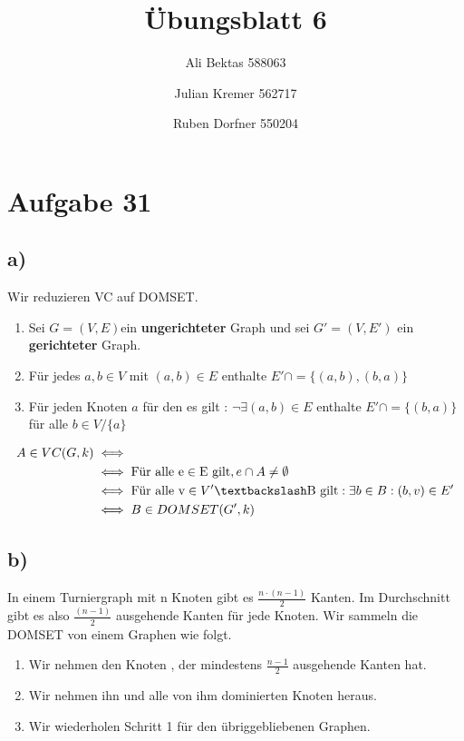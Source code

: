 \documentclass{article}
\title{Übungsblatt 6}
\author{Ali Bektas 588063 \and Julian Kremer 562717 \and Ruben Dorfner 550204}
\begin{document}
	\maketitle
	
	\section*{Aufgabe 31}
		\subsection*{a)}
			Wir reduzieren VC auf DOMSET.
			\begin{enumerate}
				\item Sei $G=(V,E)$ein \textbf{ungerichteter} Graph und sei $G'=(V,E')$ ein \textbf{gerichteter} Graph.
				\item Für jedes $a,b \in V$ mit $(a,b)\in E$ enthalte $E' \cap = \{(a,b),(b,a)\}$
				\item Für jeden Knoten $a$ für den es gilt : $\neg\exists (a,b)\in E$ enthalte $E' \cap = \{(b,a)\}$ für alle $b \in V/\{a\}$
			\end{enumerate}

			\begin{align*}
				A \in VC(G , k) &\iff \\
					&\iff \text{Für alle e} \in \text{E gilt} , e \cap A \neq \emptyset \\
					&\iff \text{Für alle v} \in V'\textbackslash \text{B gilt} : \exists b \in B : (b,v) \in E'\\
					&\iff B \in DOMSET(G' , k) \\
			\end{align*}

		\subsection*{b)}
			In einem Turniergraph mit n Knoten gibt es $ \frac{n\cdot(n-1)}{2}$ Kanten. Im Durchschnitt gibt es also $ \frac{(n-1)}{2}$ ausgehende Kanten für jede Knoten. Wir sammeln die DOMSET von einem Graphen wie folgt. 

			\begin{enumerate}
				\item Wir nehmen den Knoten , der mindestens $\frac{n-1}{2}$ ausgehende Kanten hat.
				\item Wir nehmen ihn und alle von ihm dominierten Knoten heraus.
				\item Wir wiederholen Schritt 1 für den übriggebliebenen Graphen. 
			\end{enumerate}
\end{document}
